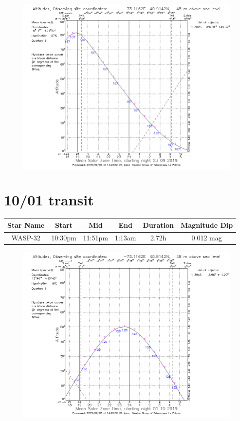 \documentclass{article}[12pt]
\begin{document}
\begin{figure}[h]
	\includegraphics[width=\linewidth]{3826_9_23.png}
\end{figure}

\newpage

\section{10/01 transit}

\begin{table}[h]
	\begin{center}
		\begin{tabular}{|c | c | c | c | c | c|}
			\hline
			Star Name & Start & Mid & End & Duration & Magnitude Dip \\
			\hline
			\hline
			WASP-32 & 10:30pm & 11:51pm & 1:13am & 2.72h & 0.012 mag\\
			\hline
		\end{tabular}
	\end{center}
\end{table}

\begin{figure}[h]
	\includegraphics[width=\linewidth]{3946_10_01.png}
\end{figure}
\end{document}
